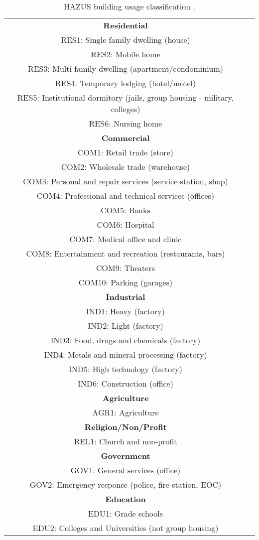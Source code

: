 \begin{table}
\centering \caption{HAZUS building usage
classification \citep{dr_FEMA99b}.}
 \label{tab:grids-HAZUSusage} \vspace{0.8em}
\begin{tabular}{|c|p{}|}
\hline
 \textbf{Residential}\\
 RES1: Single family dwelling (house)\\
 RES2: Mobile home\\
 RES3: Multi family dwelling (apartment/condominium) \\
 RES4: Temporary lodging (hotel/motel)\\
 RES5: Institutional dormitory (jails, group housing - military, colleges)\\
 RES6: Nursing home\\
\hline
\textbf{Commercial}\\
 COM1: Retail trade (store)\\
 COM2: Wholesale trade (warehouse)\\
 COM3: Personal and repair services (service station, shop)\\
 COM4: Professional and technical services (offices)\\
 COM5: Banks\\
 COM6: Hospital\\
 COM7: Medical office and clinic\\
 COM8: Entertainment and recreation (restaurants, bars)\\
 COM9: Theaters\\
 COM10: Parking (garages)\\
\hline
 \textbf{Industrial}\\
 IND1: Heavy (factory)\\
 IND2: Light (factory)\\
 IND3: Food, drugs and chemicals (factory)\\
 IND4: Metals and mineral processing (factory)\\
 IND5: High technology (factory)\\
 IND6: Construction (office)\\
\hline
 \textbf{Agriculture}\\
 AGR1: Agriculture\\
\hline
 \textbf{Religion/Non/Profit}\\
 REL1: Church and non-profit\\
\hline
 \textbf{Government}\\
 GOV1: General services (office)\\
 GOV2: Emergency response (police, fire station, EOC)\\
\hline
 \textbf{Education}\\
 EDU1: Grade schools\\
 EDU2: Colleges and Universities (not group housing)\\
\hline
\end{tabular}
\end{table}

